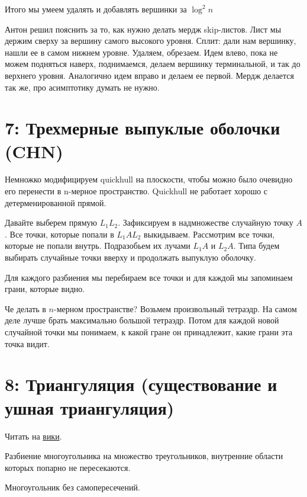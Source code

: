\documentclass[11pt]{article}
\begin{document}
Итого мы умеем удалять и добавлять вершинки за $\log^2{n}$


Антон решил пояснить за то, как нужно делать мердж skip-листов. Лист
мы держим сверху за вершину самого высокого уровня. Сплит: дали нам
вершинку, нашли ее в самом нижнем уровне. Удаляем, обрезаем. Идем
влево, пока не можем подняться наверх, поднимаемся, делаем вершинку
терминальной, и так до верхнего уровня. Аналогично идем вправо и
делаем ее первой. Мердж делается так же, про асимптотику думать не
нужно.
\section{{\bfseries{}} 7:  Трехмерные выпуклые оболочки (CHN)}
\label{sec-9}
Немножко модифицируем quickhull на плоскости, чтобы можно было
очевидно его перенести в n-мерное пространство. Quickhull не
работает хорошо с детерменированной прямой.

Давайте выберем прямую $L_1L_2$. Зафиксируем в надмножестве случайную
точку $A$. Все точки, которые попали в $L_1AL_2$
выкидываем. Рассмотрим все точки, которые не попали
внутрь. Подразобьем их лучами $L_1A$ и $L_2A$. Типа будем выбирать
случайные точки вверху и продолжать выпуклую оболочку.

Для каждого разбиения мы перебираем все точки и для каждой мы
запоминаем грани, которые видно.

Че делать в $n$-мерном пространстве? Возьмем произвольный
тетраэдр. На самом деле лучше брать максимально большой
тетраэдр. Потом для каждой новой случайной точки мы понимаем, к
какой гране он принадлежит, какие грани эта точка видит.
\section{{\bfseries{}} 8:  Триангуляция (существование и ушная триангуляция)}
\label{sec-10}
Читать на \href{http://neerc.ifmo.ru/wiki/index.php?title=Триангуляция_полигонов_(ушная_\%2B_монотонная)#.D0.A2.D0.B5.D0.BE.D1.80.D0.B5.D0.BC.D0.B0_.D0.BE_.D1.81.D1.83.D1.89.D0.B5.D1.81.D1.82.D0.B2.D0.BE.D0.B2.D0.B0.D0.BD.D0.B8.D0.B8_.D1.82.D1.80.D0.B8.D0.B0.D0.BD.D0.B3.D1.83.D0.BB.D1.8F.D1.86.D0.B8.D0.B8}{вики}.

\begin{defn}[триангуляция]
Разбиение многоугольника на множество
треугольников, внутренние области которых попарно не
пересекаются.
\end{defn}

\begin{defn}
Многоугольник без самопересечений.
\end{defn}
\end{document}
